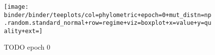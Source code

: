 \begin{sidewaysfigure*}
  \centering
  \texttt{[image: binder/binder/teeplots/col=phylometric+epoch=0+mut\_distn=np.random.standard\_normal+row=regime+viz=boxplot+x=value+y=quality+ext=]}
  \caption{TODO epoch 0}
  \label{fig:reconstructed-tree-phylometrics-epoch0}
\end{sidewaysfigure*}
